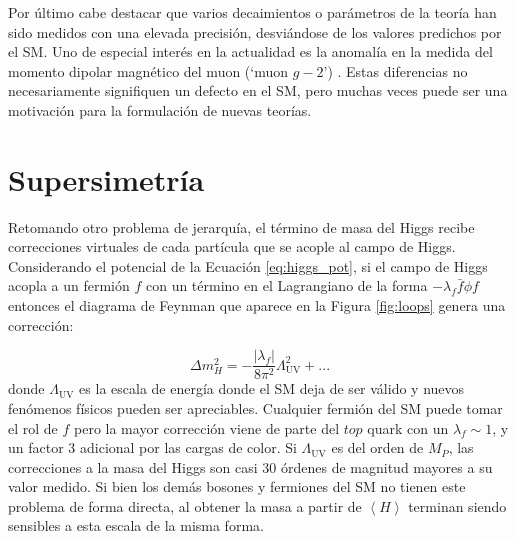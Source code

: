 Por último cabe destacar que varios decaimientos o parámetros de la teoría han sido medidos con una elevada precisión, desviándose de los valores predichos por el SM. Uno de especial interés en la actualidad es la anomalía en la medida del momento dipolar magnético del muon (`muon $g-2$') \cite{PhysRevLett.126.141801}. Estas diferencias no necesariamente signifiquen un defecto en el SM, pero muchas veces puede ser una motivación para la formulación de nuevas teorías.

\section{Supersimetría}\label{sec:susy}

Retomando otro problema de jerarquía, el término de masa del Higgs recibe correcciones virtuales de cada partícula que se acople al campo de Higgs. Considerando el potencial de la Ecuación \ref{eq:higgs_pot}, si el campo de Higgs acopla a un fermión $f$ con un término en el Lagrangiano de la forma $-\lambda_f \bar{f} \phi f$ entonces el diagrama de Feynman que aparece en la Figura \ref{fig:loops} genera una corrección:

\begin{equation}
	\Delta m_H^2 = - \frac{|\lambda_f|}{8 \pi^2}\Lambda_{\text{UV}}^2 + ...
\end{equation}
%
donde $\Lambda_{\text{UV}}$ es la escala de energía donde el SM deja de ser válido y nuevos fenómenos físicos pueden ser apreciables. Cualquier fermión del SM puede tomar el rol de $f$ pero la mayor corrección viene de parte del $top$ quark con un $\lambda_f\sim1$, y un factor 3 adicional por las cargas de color. Si $\Lambda_{\text{UV}}$ es del orden de $M_P$, las correcciones a la masa del Higgs son casi 30 órdenes de magnitud mayores a su valor medido. Si bien los demás bosones y fermiones del SM no tienen este problema de forma directa, al obtener la masa a partir de $\left<H\right>$ terminan siendo sensibles a esta escala de la misma forma.

